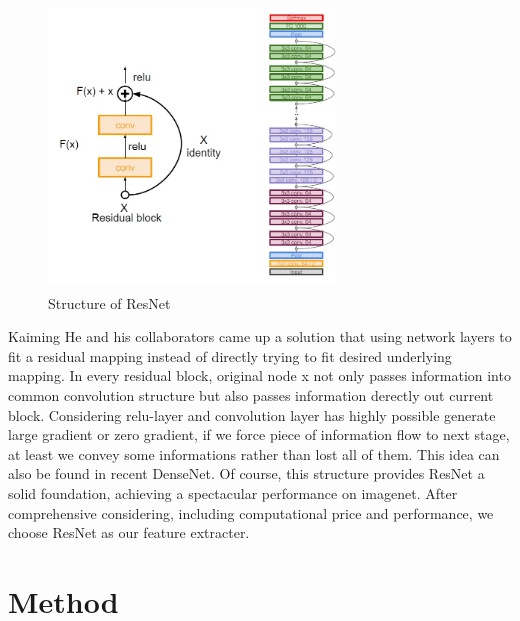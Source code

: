 \documentclass[12pt]{report}
\begin{document}
\begin{figure}
	\includegraphics[height = 3in, width = 3in]{6.jpg}
	\caption{Structure of ResNet}
	\label{fig6}
\end{figure}
\par Kaiming He and his collaborators came up a solution that using network layers to fit a residual mapping instead of directly trying to fit desired underlying mapping. In every residual block, original node x not only passes information into common convolution structure but also passes information derectly out current block. Considering relu-layer and convolution layer has highly possible generate large gradient or zero gradient, if we force piece of information flow to next stage, at least we convey some informations rather than lost all of them. This idea can also be found in recent DenseNet. Of course, this structure provides ResNet a solid foundation, achieving a spectacular performance on imagenet. After comprehensive considering, including computational price and performance, we choose ResNet as our feature extracter.

\chapter{Method}
\end{document}
